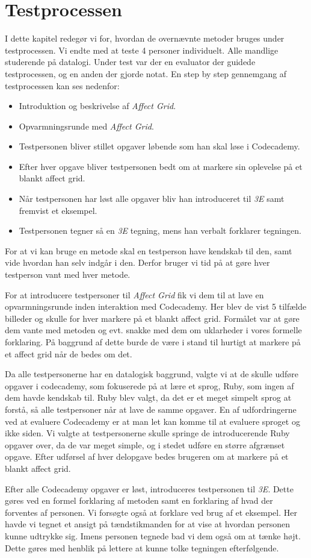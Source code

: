 \chapter{Testprocessen}\label{ch:evaproc}
I dette kapitel redegør vi for, hvordan de overnævnte metoder bruges under testprocessen. Vi endte med at teste 4 personer individuelt. Alle mandlige studerende på datalogi. Under test var der en evaluator der guidede testprocessen, og  en anden der gjorde notat.  En step by step gennemgang af testprocessen kan ses nedenfor:

\begin{itemize}
\item Introduktion og beskrivelse af \textit{Affect Grid}.
\item Opvarmningsrunde med \textit{Affect Grid}.
\item Testpersonen bliver stillet opgaver løbende som han skal løse i Codecademy.
\item Efter hver opgave bliver testpersonen bedt om at markere sin oplevelse på et blankt affect grid.
\item Når testpersonen har løst alle opgaver bliv han introduceret til \textit{3E} samt fremvist et eksempel.
\item Testpersonen tegner så en \textit{3E} tegning, mens han verbalt forklarer tegningen.
\end{itemize}


For at vi kan bruge en metode skal en testperson have kendskab til den, samt vide hvordan han selv indgår i den. Derfor bruger vi tid på at gøre hver testperson vant med hver metode.  

For at introducere testpersoner til \textit{Affect Grid} fik vi dem til at lave en opvarmningsrunde inden interaktion med Codecademy. Her blev de vist 5 tilfælde billeder og skulle for hver markere på et blankt affect grid. Formålet var at gøre dem vante med metoden og evt. snakke med dem om uklarheder i vores formelle forklaring. På baggrund af dette burde de være i stand til hurtigt at markere på et affect grid når de bedes om det. 

Da alle testpersonerne har en datalogisk baggrund, valgte vi at de skulle udføre opgaver i codecademy, som fokuserede på at lære et sprog, Ruby, som ingen af dem havde kendskab til. Ruby blev valgt, da det er et meget simpelt sprog at forstå, så alle testpersoner når at lave de samme opgaver. En af udfordringerne ved at evaluere Codecademy er at man let kan komme til at evaluere sproget og ikke siden. Vi valgte at testpersonerne skulle springe de introducerende Ruby opgaver over, da de var meget simple, og i stedet udføre en større afgrænset opgave. Efter udførsel af hver delopgave bedes brugeren om at markere på et blankt affect grid. 

Efter alle Codecademy opgaver er løst, introduceres testpersonen til \textit{3E}. Dette gøres ved en formel forklaring af metoden samt en forklaring af hvad der forventes af personen. Vi forsøgte også at forklare  ved brug af et eksempel. Her havde vi tegnet et ansigt på tændstikmanden for at vise at hvordan personen kunne udtrykke sig.  Imens personen tegnede bad vi dem også om at tænke højt. Dette gøres med henblik på lettere at kunne tolke tegningen efterfølgende. 
